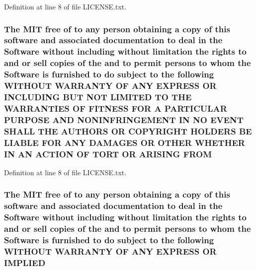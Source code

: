 Definition at line 8 of file L\-I\-C\-E\-N\-S\-E.\-txt.

\hypertarget{LICENSE_8txt_ac44d0f7742875ad0d1fc3a6de1ee0f7d}{
\subsubsection[{F\-R\-O\-M}]{\setlength{\rightskip}{0pt plus 5cm}The M\-I\-T free of to any person obtaining a {\bf copy} of this software and associated documentation to deal in the {\bf Software} without including without limitation the rights to and or sell copies of the and to permit persons to whom the {\bf Software} is furnished to do subject to the following W\-I\-T\-H\-O\-U\-T W\-A\-R\-R\-A\-N\-T\-Y O\-F A\-N\-Y E\-X\-P\-R\-E\-S\-S O\-R I\-N\-C\-L\-U\-D\-I\-N\-G B\-U\-T N\-O\-T L\-I\-M\-I\-T\-E\-D T\-O T\-H\-E W\-A\-R\-R\-A\-N\-T\-I\-E\-S O\-F F\-I\-T\-N\-E\-S\-S F\-O\-R A P\-A\-R\-T\-I\-C\-U\-L\-A\-R P\-U\-R\-P\-O\-S\-E A\-N\-D N\-O\-N\-I\-N\-F\-R\-I\-N\-G\-E\-M\-E\-N\-T I\-N N\-O E\-V\-E\-N\-T S\-H\-A\-L\-L T\-H\-E A\-U\-T\-H\-O\-R\-S O\-R C\-O\-P\-Y\-R\-I\-G\-H\-T H\-O\-L\-D\-E\-R\-S B\-E L\-I\-A\-B\-L\-E F\-O\-R A\-N\-Y D\-A\-M\-A\-G\-E\-S O\-R O\-T\-H\-E\-R W\-H\-E\-T\-H\-E\-R I\-N A\-N A\-C\-T\-I\-O\-N O\-F T\-O\-R\-T O\-R A\-R\-I\-S\-I\-N\-G F\-R\-O\-M}}\label{LICENSE_8txt_ac44d0f7742875ad0d1fc3a6de1ee0f7d}


Definition at line 8 of file L\-I\-C\-E\-N\-S\-E.\-txt.

\hypertarget{LICENSE_8txt_ab0624cdd79a1b72ae3e8cb7b147149da}{
\subsubsection[{I\-M\-P\-L\-I\-E\-D}]{\setlength{\rightskip}{0pt plus 5cm}The M\-I\-T free of to any person obtaining a {\bf copy} of this software and associated documentation to deal in the {\bf Software} without including without limitation the rights to and or sell copies of the and to permit persons to whom the {\bf Software} is furnished to do subject to the following W\-I\-T\-H\-O\-U\-T W\-A\-R\-R\-A\-N\-T\-Y O\-F A\-N\-Y E\-X\-P\-R\-E\-S\-S O\-R I\-M\-P\-L\-I\-E\-D}}\label{LICENSE_8txt_ab0624cdd79a1b72ae3e8cb7b147149da}



